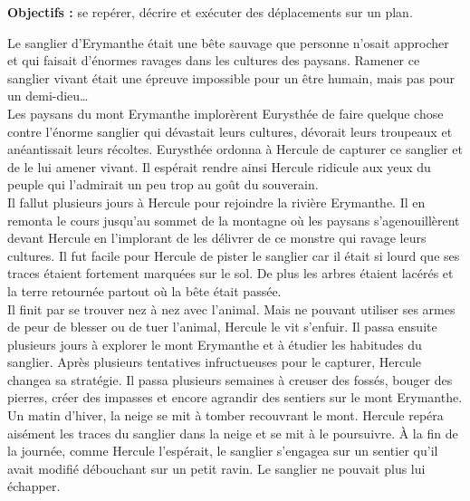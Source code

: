 \begin{changemargin}{-15mm}{-15mm}
    \begin{activite}        
        {\bf Objectifs :} se repérer, décrire et exécuter des déplacements sur un plan.
            \ \\
            \hspace*{1cm}
            \begin{minipage}{14cm}
                Le sanglier d’Erymanthe était une bête sauvage que personne n’osait approcher et qui faisait d’énormes ravages dans les cultures des paysans. Ramener ce sanglier vivant était une épreuve impossible pour un être humain, mais pas pour un demi-dieu\dots \\
                
                Les paysans du mont Erymanthe implorèrent Eurysthée de faire quelque chose contre l’énorme sanglier qui dévastait leurs cultures, dévorait leurs troupeaux et anéantissait leurs récoltes. Eurysthée ordonna à Hercule de capturer ce sanglier et de le lui amener vivant. Il espérait rendre ainsi Hercule ridicule aux yeux du peuple qui l’admirait un peu trop au goût du souverain. \\
                
                Il fallut plusieurs jours à Hercule pour rejoindre la rivière Erymanthe. Il en remonta le cours jusqu’au sommet de la montagne où les paysans s’agenouillèrent devant Hercule en l’implorant de les délivrer de ce monstre qui ravage leurs cultures. Il fut facile pour Hercule de pister le sanglier car il était si lourd que ses traces étaient fortement marquées sur le sol. De plus les arbres étaient lacérés et la terre retournée partout où la bête était passée. \\
                
                Il finit par se trouver nez à nez avec l’animal. Mais ne pouvant utiliser ses armes de peur de blesser ou de tuer l’animal, Hercule le vit s’enfuir. Il passa ensuite plusieurs jours à explorer le mont Erymanthe et à étudier les habitudes du sanglier. Après plusieurs tentatives infructueuses pour le capturer, Hercule changea sa stratégie. Il passa plusieurs semaines à creuser des fossés, bouger des pierres, créer des impasses et encore agrandir des sentiers sur le mont Erymanthe. \\
                
                Un matin d’hiver, la neige se mit à tomber recouvrant le mont. Hercule repéra aisément les traces du sanglier dans la neige et se mit à le poursuivre. À la fin de la journée, comme Hercule l’espérait, le sanglier s’engagea sur un sentier qu’il avait modifié débouchant sur un petit ravin. Le sanglier ne pouvait plus lui échapper. \\
                

\end{minipage}
\end{activite}
\end{changemargin}
